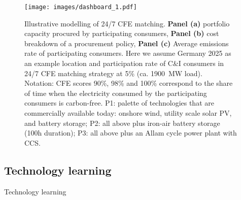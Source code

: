 \documentclass[pdflatex,sn-basic, Numbered]{sn-jnl}%
\theoremstyle{thmstyleone}%
\theoremstyle{thmstyletwo}%
\theoremstyle{thmstylethree}%
\begin{document}
\FloatBarrier
\begin{figure}[htbp]
    \centering
    \texttt{[image: images/dashboard\_1.pdf]}
    \captionsetup{width=0.85\textwidth}
    \caption{Illustrative modelling of 24/7 CFE matching.
    \textbf{Panel (a)} portfolio capacity procured by participating consumers,  
    \textbf{Panel (b)} cost breakdown of a procurement policy,
    \textbf{Panel (c)} Average emissions rate of participating consumers. 
    Here we assume Germany 2025 as an example location and participation rate of C\&I consumers in 24/7 CFE matching strategy at 5\% (ca. 1900~MW load). \\
    Notation: CFE scores 90\%, 98\% and 100\% correspond to the share of time when the electricity consumed by the participating consumers is carbon-free.
    P1: palette of technologies that are commercially available today: onshore wind, utility scale solar PV, and battery storage; P2: all above plus iron-air battery storage (100h duration); P3: all above plus an Allam cycle power plant with CCS.}\label{fig:dashboard}
\end{figure}
\FloatBarrier

\subsection*{Technology learning}\label{sec3}

Technology learning 
\end{document}
